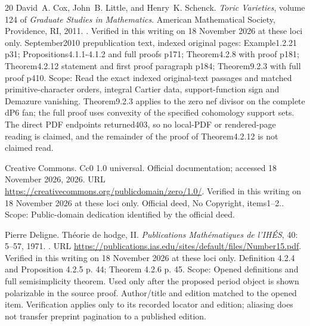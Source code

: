 \documentclass[11pt,a4paper]{article}
\theoremstyle{definition}
\begin{document}
\begin{thebibliography}{20}
David~A. Cox, John~B. Little, and Henry~K. Schenck.
\newblock \emph{Toric Varieties}, volume 124 of \emph{Graduate Studies in
  Mathematics}.
\newblock American Mathematical Society, Providence, RI, 2011.
\newblock {}.
\newblock Verified in this writing on 18 November 2026 at these loci only.
  September2010 prepublication text, indexed original pages: Example1.2.21 p31;\allowbreak{}
  Propositions4.1.1-4.1.2 and full proofs p171;\allowbreak{} Theorem4.2.8 with proof p181;\allowbreak{}
  Theorem4.2.12 statement and first proof paragraph p184;\allowbreak{} Theorem9.2.3 with
  full proof p410. Scope: Read the exact indexed original-text passages and
  matched primitive-character orders, integral Cartier data, support-function
  sign and Demazure vanishing. Theorem9.2.3 applies to the zero nef divisor on
  the complete dP6 fan;\allowbreak{} the full proof uses convexity of the specified
  cohomology support sets. The direct PDF endpoints returned403, so no
  local-PDF or rendered-page reading is claimed, and the remainder of the proof
  of Theorem4.2.12 is not claimed read.

{Creative Commons}.
\newblock Cc0 1.0 universal.
\newblock Official documentation;\allowbreak{} accessed 18 November 2026, 2026.
\newblock URL \url{https://creativecommons.org/publicdomain/zero/1.0/}.
\newblock Verified in this writing on 18 November 2026 at these loci only.
  Official deed, No Copyright, items1–2.. Scope: Public-domain dedication
  identified by the official deed.

Pierre Deligne.
\newblock Th{\'e}orie de hodge, {II}.
\newblock \emph{Publications Math{\'e}matiques de l'IH{\'E}S}, 40:
  5--57, 1971.
\newblock {}.
\newblock URL
  \url{https://publications.ias.edu/sites/default/files/Number15.pdf}.
\newblock Verified in this writing on 18 November 2026 at these loci only.
  Definition 4.2.4 and Proposition 4.2.5 p. 44;\allowbreak{} Theorem 4.2.6 p. 45. Scope:
  Opened definitions and full semisimplicity theorem. Used only after the
  proposed period object is shown polarizable in the source proof. Author/title
  and edition matched to the opened item. Verification applies only to its
  recorded locator and edition;\allowbreak{} aliasing does not transfer preprint pagination
  to a published edition.


\end{thebibliography}
\end{document}
